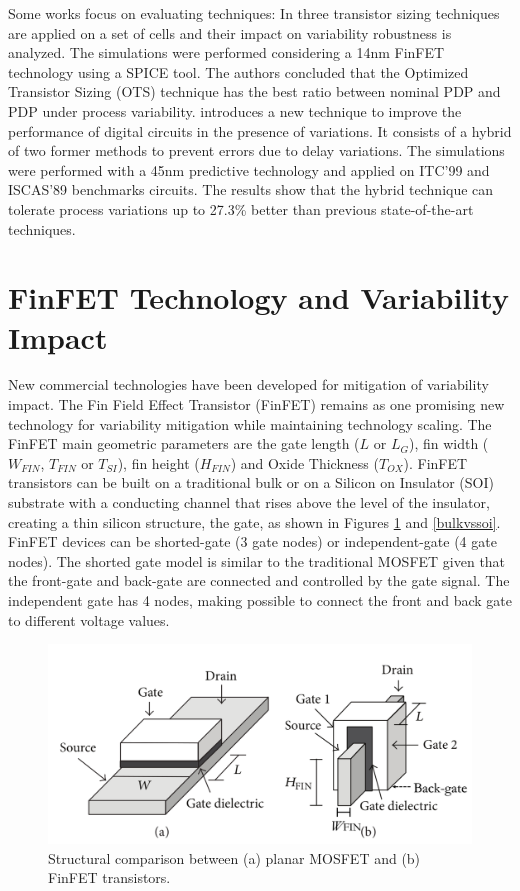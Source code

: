 \documentclass[pgmicro,mestrado,english]{iiufrgs}
\begin{document}
Some works focus on evaluating techniques: In \cite{zimpeck2016finfet} three transistor sizing techniques are applied on a set of cells and their impact on variability robustness is analyzed. The simulations were performed considering a 14nm FinFET technology using a SPICE tool. The authors concluded that the Optimized Transistor Sizing (OTS) technique has the best ratio between nominal PDP and PDP under process variability. \cite{ahmadi2017hybrid} introduces a new technique to improve the performance of digital circuits in the presence of variations. It consists of a hybrid of two former methods to prevent errors due to delay variations. The simulations were performed with a 45nm predictive technology and applied on ITC’99 and ISCAS’89 benchmarks circuits. The results show that the hybrid technique can tolerate process variations up to 27.3\% better than previous state-of-the-art techniques.

\section{FinFET Technology and Variability Impact}

New commercial technologies have been developed for mitigation of variability impact. The Fin Field Effect Transistor (FinFET) remains as one promising new technology for variability mitigation while maintaining technology scaling. The FinFET main geometric parameters are the gate length ($L$ or $L_G$), fin width ($W_{FIN}$, $T_{FIN}$ or $T_{SI}$), fin height ($H_{FIN}$) and Oxide Thickness ($T_{OX}$). FinFET transistors can be built on a traditional bulk or on a Silicon on Insulator (SOI) substrate with a conducting channel that rises above the level of the insulator, creating a thin silicon structure, the gate, as shown in Figures \ref{mosfetvsfinfet} and \ref{bulkvssoi}. FinFET devices can be shorted-gate (3 gate nodes) or independent-gate (4 gate nodes). The shorted gate model is similar to the traditional MOSFET given that the front-gate and back-gate are connected and controlled by the gate signal. The independent gate has 4 nodes, making possible to connect the front and back gate to different voltage values.

    \begin{figure} []
        \centering
	    \includegraphics[width=\textwidth, trim={0 0 0 0},clip]{finfet.pdf}
        \caption{Structural comparison between (a) planar MOSFET and (b) FinFET transistors.}
        \label{mosfetvsfinfet}
    \end{figure}
\end{document}
